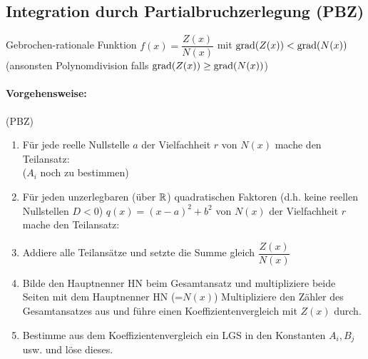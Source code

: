 \clearpage
\subsection{Integration durch Partialbruchzerlegung (PBZ)}
Gebrochen-rationale Funktion $f(x)=\dfrac{Z(x)}{N(x)}$ mit $\mathbin\text{grad}(Z(x))<\mathbin\text{grad}(N(x))$ (ansonsten Polynomdivision falls $\mathbin\text{grad}(Z(x))\ge\mathbin\text{grad}(N(x))$)

\paragraph{Vorgehensweise:} (PBZ)
\begin{enumerate}
	\item Für jede reelle Nullstelle $a$ der Vielfachheit $r$ von $N(x)$ mache den Teilansatz:\\
	\quad($A_i$ noch zu bestimmen)
	\item Für jeden unzerlegbaren (über $\mathbb{R}$) quadratischen Faktoren (d.h. keine reellen Nullstellen $D<0$) $q(x)=(x-a)^2+b^2$ von $N(x)$ der Vielfachheit $r$ mache den Teilansatz:\\
	\item Addiere alle Teilansätze und setzte die Summe gleich $\dfrac{Z(x)}{N(x)}$
	\item Bilde den Hauptnenner HN beim Gesamtansatz und multipliziere beide Seiten mit dem Hauptnenner HN (=$N(x)$) Multipliziere den Zähler des Gesamtansatzes aus und führe einen Koeffizientenvergleich mit $Z(x)$ durch.
	\item Bestimme aus dem Koeffizientenvergleich ein LGS in den Konstanten $A_i,B_j$ usw. und löse dieses.
\end{enumerate}

